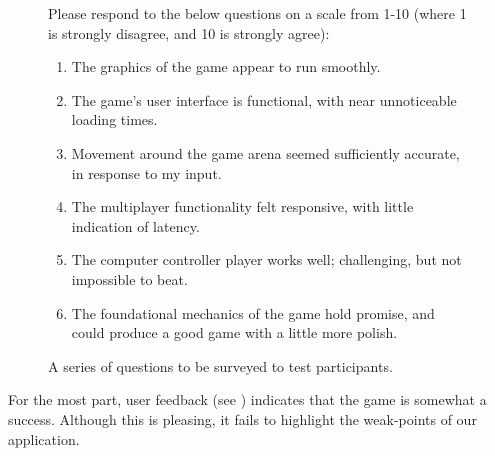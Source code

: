 \documentclass{standalone}
\begin{document}
		\begin{figure}[!htbp]
			\begin{formal}
				Please respond to the below questions on a scale from 1-10 (where 1 is strongly disagree, and 10 is strongly agree):
				\begin{enumerate}
					\item The graphics of the game appear to run smoothly.
					\item The game's user interface is functional, with near unnoticeable loading times. 
					\item Movement around the game arena seemed sufficiently accurate, in response to my input.
					\item The multiplayer functionality felt responsive, with little indication of latency.
					\item The computer controller player works well; challenging, but not impossible to beat.
					\item The foundational mechanics of the game hold promise, and could produce a good game with a little more polish.
				\end{enumerate}
				\caption{A series of questions to be surveyed to test participants.} \label{fig:userSurvey}
			\end{formal}
		\end{figure}
		\FloatBarrier

		For the most part, user feedback (see ) indicates that the game is somewhat a success. Although this is pleasing, it fails to highlight the weak-points of our application.
\end{document}
